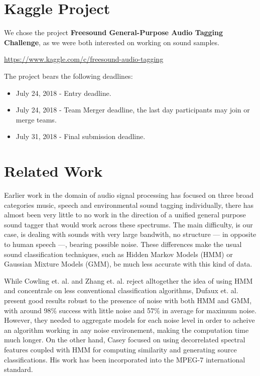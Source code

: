 \documentclass{article} %
\begin{document}
\section{Kaggle Project}

	We chose the project \textbf{Freesound General-Purpose Audio Tagging Challenge}, as we were both interested on working on sound samples.
	\begin{center}
	   \url{https://www.kaggle.com/c/freesound-audio-tagging}
	\end{center}
	The project bears the following deadlines:
	\begin{itemize}
	    \item July 24, 2018 - Entry deadline.
	    \item July 24, 2018 - Team Merger deadline, the last day participants may join or merge teams.
	    \item July 31, 2018 - Final submission deadline.
	\end{itemize}
    

\section{Related Work}
    Earlier work in the domain of audio signal processing has focused on three broad categories music, speech and environmental sound tagging individually, there has almost been very little to no work in the direction of a unified general purpose sound tagger that would work across these spectrums.
    The main difficulty, is our case, is dealing with sounds with very large bandwith, no structure --- in opposite to human speech ---, bearing possible noise. These differences make the usual sound classification techniques, such as Hidden Markov Models (HMM) or Gaussian Mixture Models (GMM), be much less accurate with this kind of data.

    While Cowling et. al. \cite{cite1} and Zhang et. al. \cite{cite2} reject alltogether the idea of using HMM and concentrale on less conventional classification algorithms, Dufaux et. al. \cite{cite3} present good results robust to the presence of noise with both HMM and GMM, with around 98\% success with little noise and 57\% in average for maximum noise. However, they needed to aggregate models for each noise level in order to acheive an algorithm working in any noise environement, making the computation time much longer. On the other hand, Casey \cite{cite4} focused on using decorrelated spectral features coupled with HMM for computing similarity and generating source classifications. His work has been incorporated into the MPEG-7 international standard. 
\end{document}
